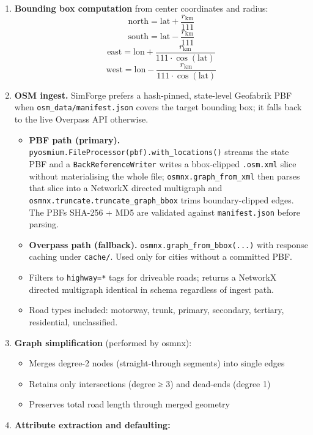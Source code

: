 \begin{enumerate}
\def\labelenumi{\arabic{enumi}.}
\item
  \textbf{Bounding box computation} from center coordinates and radius:
  \[\text{north} = \text{lat} + \frac{r_\text{km}}{111}\]
  \[\text{south} = \text{lat} - \frac{r_\text{km}}{111}\]
  \[\text{east} = \text{lon} + \frac{r_\text{km}}{111 \cdot \cos(\text{lat})}\]
  \[\text{west} = \text{lon} - \frac{r_\text{km}}{111 \cdot \cos(\text{lat})}\]
\item
  \textbf{OSM ingest.} SimForge prefers a hash-pinned, state-level
  Geofabrik PBF when \texttt{osm\_data/manifest.json} covers the target
  bounding box; it falls back to the live Overpass API otherwise.

  \begin{itemize}
  \tightlist
  \item
    \textbf{PBF path (primary).}
    \texttt{pyosmium.FileProcessor(pbf).with\_locations()} streams the
    state PBF and a \texttt{BackReferenceWriter} writes a bbox-clipped
    \texttt{.osm.xml} slice without materialising the whole file;
    \texttt{osmnx.graph\_from\_xml} then parses that slice into a
    NetworkX directed multigraph and
    \texttt{osmnx.truncate.truncate\_graph\_bbox} trims boundary-clipped
    edges. The PBF\textquotesingle s SHA-256 + MD5 are validated against
    \texttt{manifest.json} before parsing.
  \item
    \textbf{Overpass path (fallback).}
    \texttt{osmnx.graph\_from\_bbox(...)} with response caching under
    \texttt{cache/}. Used only for cities without a committed PBF.
  \item
    Filters to \texttt{highway=*} tags for driveable roads; returns a
    NetworkX directed multigraph identical in schema regardless of
    ingest path.
  \item
    Road types included: motorway, trunk, primary, secondary, tertiary,
    residential, unclassified.
  \end{itemize}
\item
  \textbf{Graph simplification} (performed by osmnx):

  \begin{itemize}
  \tightlist
  \item
    Merges degree-2 nodes (straight-through segments) into single edges
  \item
    Retains only intersections (degree ≥ 3) and dead-ends (degree 1)
  \item
    Preserves total road length through merged geometry
  \end{itemize}
\item
  \textbf{Attribute extraction and defaulting:}


\end{enumerate}

